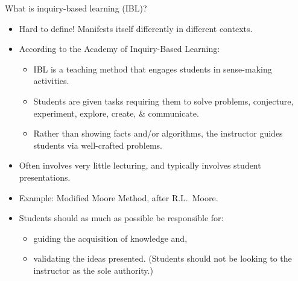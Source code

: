 \documentclass[10pt]{beamer}
\begin{document}
\begin{frame}

\begin{block}{What is inquiry-based learning (IBL)?}
\begin{itemize}
\item<2-> Hard to define! Manifests itself differently in different contexts.\pause
\item<3-> According to the \alert{Academy of Inquiry-Based Learning}:
\begin{itemize}\normalsize
\item<3-> IBL is a teaching method that engages students in sense-making activities.
\item Students are given tasks requiring them to solve problems, conjecture, experiment, explore, create, \& communicate.
\item<3-> Rather than showing facts and/or algorithms, the instructor guides students via well-crafted problems. \pause
\end{itemize}
\item<4-> Often involves very little lecturing, and typically involves student presentations.\pause
\item<5-> Example: Modified Moore Method, after R.L.~Moore. \pause
\item<6-> Students should as much as possible be responsible for:
\begin{itemize}\normalsize
\item<7-> guiding the acquisition of knowledge and,
\item<7-> validating the ideas presented. (Students should not be looking to the instructor as the sole authority.)
\end{itemize}
\end{itemize}
\end{block}

\end{frame}

\end{document}
